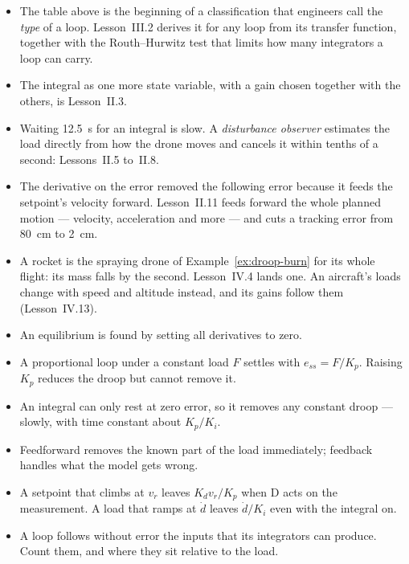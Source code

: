 \begin{lookahead}
\begin{itemize}[leftmargin=1.2em]
  \item The table above is the beginning of a classification that engineers call the \emph{type} of a loop. Lesson~III.2 derives it for any loop from its transfer function, together with the Routh–Hurwitz test that limits how many integrators a loop can carry.
  \item The integral as one more state variable, with a gain chosen together with the others, is Lesson~II.3.
  \item Waiting \SI{12.5}{s} for an integral is slow. A \emph{disturbance observer} estimates the load directly from how the drone moves and cancels it within tenths of a second: Lessons~II.5 to~II.8.
  \item The derivative on the error removed the following error because it feeds the setpoint's velocity forward. Lesson~II.11 feeds forward the whole planned motion — velocity, acceleration and more — and cuts a tracking error from \SI{80}{cm} to \SI{2}{cm}.
  \item A rocket is the spraying drone of Example~\ref{ex:droop-burn} for its whole flight: its mass falls by the second. Lesson~IV.4 lands one. An aircraft's loads change with speed and altitude instead, and its gains follow them (Lesson~IV.13).
\end{itemize}
\end{lookahead}

\begin{remember}
\begin{itemize}
  \item An equilibrium is found by setting all derivatives to zero.
  \item A proportional loop under a constant load $F$ settles with $e_{ss} = F/K_p$. Raising $K_p$ reduces the droop but cannot remove it.
  \item An integral can only rest at zero error, so it removes any constant droop — slowly, with time constant about $K_p/K_i$.
  \item Feedforward removes the known part of the load immediately; feedback handles what the model gets wrong.
  \item A setpoint that climbs at $v_r$ leaves $K_d v_r/K_p$ when D acts on the measurement. A load that ramps at $\dot d$ leaves $\dot d/K_i$ even with the integral on.
  \item A loop follows without error the inputs that its integrators can produce. Count them, and where they sit relative to the load.
\end{itemize}
\end{remember}

